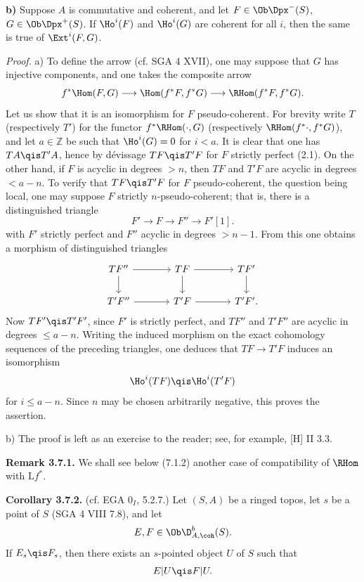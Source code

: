 \documentclass[11pt]{article}
\begin{document}
\textbf{b)} Suppose \(A\) is commutative and coherent, and let \(F\in\Ob\Dpx^-(S)\), \(G\in\Ob\Dpx^+(S)\). If \(\Ho^i(F)\) and \(\Ho^i(G)\) are coherent for all \(i\), then the same is true of \(\Ext^i(F,G)\).

\emph{Proof.} a) To define the arrow (cf. SGA 4 XVII), one may suppose that \(G\) has injective components, and one takes the composite arrow
\[
  f^*\Hom(F,G)\longrightarrow \Hom(f^*F,f^*G)
  \longrightarrow \RHom(f^*F,f^*G).
\]
Let us show that it is an isomorphism for \(F\) pseudo-coherent. For brevity write \(T\) (respectively \(T'\)) for the functor \(f^*\RHom(\cdot,G)\) (respectively \(\RHom(f^*\cdot,f^*G)\)), and let \(a\in\mathbb Z\) be such that \(\Ho^i(G)=0\) for \(i<a\). It is clear that one has \(TA\qis T'A\), hence by dévissage \(TF\qis T'F\) for \(F\) strictly perfect (2.1). On the other hand, if \(F\) is acyclic in degrees \(>n\), then \(TF\) and \(T'F\) are acyclic in degrees \(<a-n\). To verify that \(TF\qis T'F\) for \(F\) pseudo-coherent, the question being local, one may suppose \(F\) strictly \(n\)-pseudo-coherent; that is, there is a distinguished triangle
\[
  F'\longrightarrow F\longrightarrow F''\longrightarrow F'[1].
\]
with \(F'\) strictly perfect and \(F''\) acyclic in degrees \(>n-1\). From this one obtains a morphism of distinguished triangles
\[
\begin{tikzcd}[column sep=large]
TF'' \arrow[r] \arrow[d] & TF \arrow[r] \arrow[d] & TF' \arrow[d] \\
T'F'' \arrow[r] & T'F \arrow[r] & T'F' .
\end{tikzcd}
\]
Now \(TF'\qis T'F'\), since \(F'\) is strictly perfect, and \(TF''\) and \(T'F''\) are acyclic in degrees \(\leq a-n\). Writing the induced morphism on the exact cohomology sequences of the preceding triangles, one deduces that \(TF\to T'F\) induces an isomorphism
\[
  \Ho^i(TF)\qis \Ho^i(T'F)
\]
for \(i\leq a-n\). Since \(n\) may be chosen arbitrarily negative, this proves the assertion.

b) The proof is left as an exercise to the reader; see, for example, [H] II 3.3.

\textbf{Remark 3.7.1.} We shall see below (7.1.2) another case of compatibility of \(\RHom\) with \(\mathrm L f^*\).

\textbf{Corollary 3.7.2.} (cf. EGA \(0_I\), 5.2.7.) Let \((S,A)\) be a ringed topos, let \(s\) be a point of \(S\) (SGA 4 VIII 7.8), and let
\[
  E,F\in\Ob\D^b_{A,\coh}(S).
\]
If \(E_s\qis F_s\), then there exists an \(s\)-pointed object \(U\) of \(S\) such that
\[
  E|U\qis F|U.
\]
\end{document}
